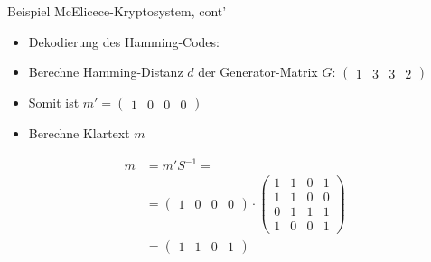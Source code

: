 \documentclass[11pt%
,aspectratio=169%
]{beamer}
\begin{document}
\begin{frame}{Beispiel McElicece-Kryptosystem, cont'}
\begin{itemize}
    \item Dekodierung des Hamming-Codes:
    \item Berechne Hamming-Distanz $d$ der Generator-Matrix $G$: $\begin{pmatrix} 1 & 3 & 3 & 2 \end{pmatrix}$
    \item Somit ist $m' = \begin{pmatrix} 1 & 0 & 0 & 0\end{pmatrix}$
    \item Berechne Klartext $m$
\end{itemize}

\begin{align*}
        m &= m'S^{-1}=\\
        &= \begin{pmatrix} 1 & 0 & 0 & 0 \end{pmatrix} \cdot \begin{pmatrix} 1 & 1 & 0 & 1 \\ 1 & 1 & 0 & 0 \\ 0 & 1 & 1 & 1 \\ 1 & 0 & 0 & 1 \end{pmatrix}\\
        &= \begin{pmatrix} 1 & 1 & 0 & 1 \end{pmatrix}
\end{align*}
\end{frame}
\end{document}

